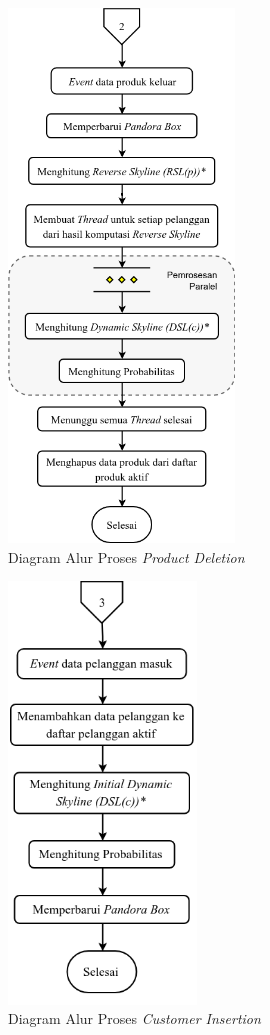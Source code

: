 \begin{figure}[H]
	\centering
	\includegraphics[width=6cm]{assets/img/bab3/flowchart-po.png}
	\caption{Diagram Alur Proses \textit{Product Deletion}}
	\label{fig:flowchart-po}
\end{figure}

\begin{figure}[H]
	\centering
	\includegraphics[width=5cm]{assets/img/bab3/flowchart-ci.png}
	\caption{Diagram Alur Proses \textit{Customer Insertion}}
	\label{fig:flowchart-ci}
\end{figure}

